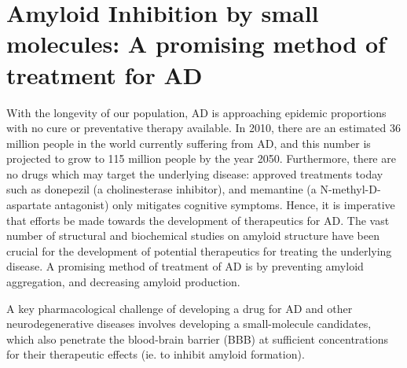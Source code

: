 \section{Amyloid Inhibition by small molecules: A promising method of treatment for AD}
      



With the longevity of our population, AD is approaching epidemic proportions with no cure or preventative therapy available.\cite{Blennow:2006wd} In 2010, there are an estimated 36 million people in the world currently suffering from AD, and this number is projected to grow to 115 million people by the year 2050.\cite{alzreport:2012}  Furthermore, there are no drugs which may target the underlying disease: approved treatments today such as donepezil (a cholinesterase inhibitor), and memantine (a N-methyl-D-aspartate antagonist) only mitigates cognitive symptoms. Hence, it is imperative that efforts be made towards the development of therapeutics for AD.  The vast number of structural and biochemical studies on amyloid structure have been crucial for the development of potential therapeutics for treating the underlying disease.  A promising method of treatment of AD is by preventing amyloid aggregation, and decreasing amyloid production.


A key pharmacological challenge of developing a drug for AD and other neurodegenerative diseases involves developing a small-molecule candidates, which also penetrate the blood-brain barrier (BBB) at sufficient concentrations for their therapeutic effects (ie. to inhibit amyloid formation). %

